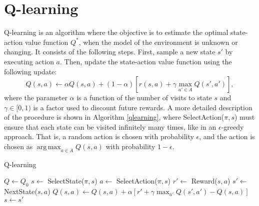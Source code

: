 \documentclass{article} %
\DeclareMathOperator*{\argmax}{arg\,max}
\begin{document}
\section{Q-learning}
Q-learning is an algorithm where the objective is to estimate the optimal state-action value function $Q^*$, when the model of the environment is unknown or changing. It consists of the following steps.  First, sample a new state $s'$ by executing action $a$.  Then, update the state-action value function using the following update:
$$Q(s,a) \leftarrow \alpha Q(s,a) + (1-\alpha)[r(s,a) + \gamma \max_{a' \in A}Q(s', a')],$$
where the parameter $\alpha$ is a function of the number of visits to state $s$ and $\gamma \in [0,1)$ is a factor used to discount future rewards.  A more detailed description of the procedure is shown in Algorithm \ref{qlearning}, where SelectAction($\pi,s$) must ensure that each state can be visited infinitely many times, like in an $\epsilon$-greedy approach.  That is, a random action is chosen with probability $\epsilon$, and the action is chosen as $\argmax_{a\in A} Q(s,a)$ with probability $1-\epsilon$.
\begin{algorithm}
 \caption{Q-learning}\label{euclid}
  \begin{algorithmic}[1]
      \State $Q\gets Q_0$
        \State $s \gets $ SelectState($\pi,s$)
        	\State $a \gets$ SelectAction($\pi,s$)
        	\State $r' \gets$ Reward($s,a$)
        	\State $s' \gets$ NextState($s,a$)
        	\State $Q(s,a) \gets Q(s,a) + \alpha[r' + \gamma\max_{a'}Q(s',a')-Q(s,a)]$
        	\State $s \gets s'$
        \EndFor
      \EndFor
      \State {}
    \EndProcedure
  \end{algorithmic}
  \label{qlearning}
\end{algorithm}
\end{document}
